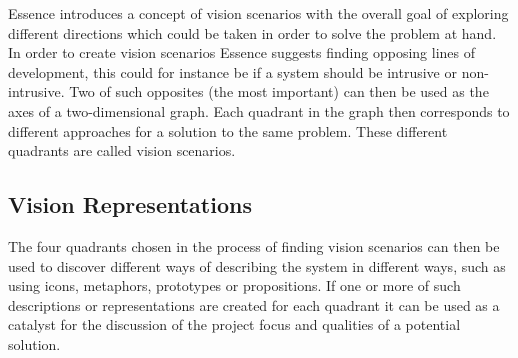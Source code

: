 Essence introduces a concept of vision scenarios with the overall goal of exploring different directions which could be taken in order to solve the problem at hand. In order to create vision scenarios Essence suggests finding opposing lines of development, this could for instance be if a system should be intrusive or non-intrusive. Two of such opposites (the most important) can then be used as the axes of a two-dimensional graph. Each quadrant in the graph then corresponds to different approaches for a solution to the same problem. These different quadrants are called vision scenarios.

\subsection{Vision Representations}
\label{sub:vision_representations}

The four quadrants chosen in the process of finding vision scenarios can then be used to discover different ways of describing the system in different ways, such as using icons, metaphors, prototypes or propositions. If one or more of such descriptions or representations are created for each quadrant it can be used as a catalyst for the discussion of the project focus and qualities of a potential solution. 



